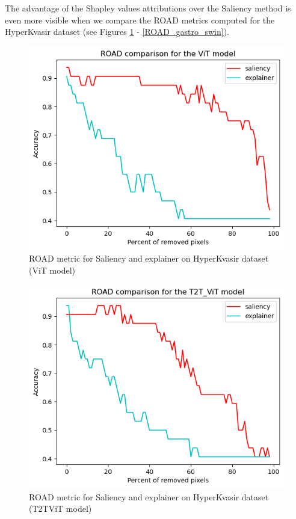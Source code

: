 \documentclass[en]{pracamgr}
\begin{document}
The advantage of the Shapley values attributions over the Saliency method is even more visible when we compare the ROAD metrics computed for the HyperKvasir dataset (see Figures \ref{ROAD_gastro_vit} - \ref{ROAD_gastro_swin}).


\begin{figure}[H]
\centering
\includegraphics[scale=0.5]{./images/ROAD_gastro_vit.png}
\caption{ROAD metric for Saliency and explainer on HyperKvasir dataset (ViT model)}
\label{ROAD_gastro_vit}
\end{figure}


\begin{figure}[H]
\centering
\includegraphics[scale=0.5]{./images/ROAD_gastro_t2t_vit.png}
\caption{ROAD metric for Saliency and explainer on HyperKvasir dataset (T2T\textunderscore ViT model)}
\label{ROAD_gastro_t2t_vit}
\end{figure}
\end{document}
